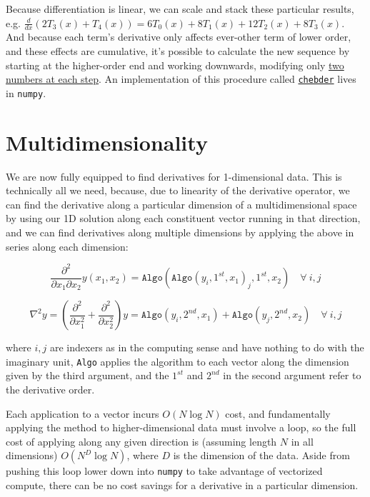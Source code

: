 \documentclass[10pt]{article}
\begin{document}
Because differentiation is linear, we can scale and stack these particular results, e.g. $\frac{d}{dx}(2T_3(x) + T_4(x)) = 6T_0(x) + 8T_1(x) + 12T_2(x) + 8T_3(x)$. And because each term's derivative only affects ever-other term of lower order, and these effects are cumulative, it's possible to calculate the new sequence by starting at the higher-order end and working downwards, modifying only \href{https://scicomp.stackexchange.com/q/44939/48402}{two numbers at each step}\cite{dcoefs}. An implementation of this procedure called \href{https://github.com/numpy/numpy/blob/v2.2.0/numpy/polynomial/chebyshev.py#L874-L961}{\texttt{chebder}}\cite{chebder} lives in \texttt{numpy}.


\section{Multidimensionality}

We are now fully equipped to find derivatives for 1-dimensional data. This is technically all we need, because, due to linearity of the derivative operator, we can find the derivative along a particular dimension of a multidimensional space by using our 1D solution along each constituent vector running in that direction, and we can find derivatives along multiple dimensions by applying the above in series along each dimension:

$$\frac{\partial^2}{\partial x_1 \partial x_2} y(x_1, x_2) = \texttt{Algo}(\texttt{Algo}(y_i, 1^{st}, x_1)_j, 1^{st}, x_2) \quad \forall\ i, j$$

$$ \nabla^2 y = (\frac{\partial^2}{\partial x_1^2} + \frac{\partial^2}{\partial x_2^2}) y = \texttt{Algo}(y_i, 2^{nd}, x_1) + \texttt{Algo}(y_j, 2^{nd}, x_2) \quad \forall\ i, j$$

where $i, j$ are indexers as in the computing sense and have nothing to do with the imaginary unit, \texttt{Algo} applies the algorithm to each vector along the dimension given by the third argument, and the $1^{st}$ and $2^{nd}$ in the second argument refer to the derivative order.

Each application to a vector incurs $O(N \log N)$ cost, and fundamentally applying the method to higher-dimensional data must involve a loop, so the full cost of applying along any given direction is (assuming length $N$ in all dimensions) $O(N^D \log N)$, where $D$ is the dimension of the data. Aside from pushing this loop lower down into \texttt{numpy} to take advantage of vectorized compute, there can be no cost savings for a derivative in a particular dimension.
\end{document}
